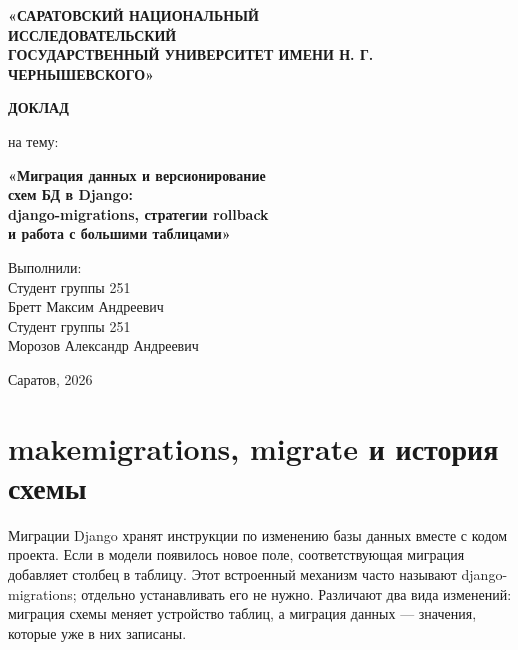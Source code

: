 \documentclass[11pt,a4paper]{article}
\begin{document}
\hypersetup{pageanchor=false}
\begin{titlepage}
\thispagestyle{empty}
\begin{center}
\vspace*{15mm}
{\fontsize{14}{17}\selectfont\bfseries
«САРАТОВСКИЙ НАЦИОНАЛЬНЫЙ\\
ИССЛЕДОВАТЕЛЬСКИЙ\\
ГОСУДАРСТВЕННЫЙ УНИВЕРСИТЕТ ИМЕНИ Н. Г.\\
ЧЕРНЫШЕВСКОГО»\par}
\vspace{40mm}
{\fontsize{20}{24}\selectfont\bfseries ДОКЛАД\par}
\vspace{7mm}
{\large на тему:\par}
\vspace{5mm}
{\fontsize{16}{20}\selectfont\bfseries
«Миграция данных и версионирование\\
схем БД в Django:\\
django-migrations, стратегии rollback\\
и работа с большими таблицами»\par}
\end{center}
\vspace{25mm}
\noindent\hfill\begin{minipage}{0.54\textwidth}
\fontsize{12}{15}\selectfont
Выполнили:\\[3mm]
Студент группы 251\\
Бретт Максим Андреевич\\[5mm]
Студент группы 251\\
Морозов Александр Андреевич
\end{minipage}
\vfill
\begin{center}Саратов, 2026\end{center}
\end{titlepage}
\setcounter{page}{2}
\hypersetup{pageanchor=true}
\section{makemigrations, migrate и история схемы}

Миграции Django хранят инструкции по изменению базы данных вместе с кодом проекта. Если в модели появилось новое поле, соответствующая миграция добавляет столбец в таблицу. Этот встроенный механизм часто называют django-migrations; отдельно устанавливать его не нужно. Различают два вида изменений: миграция схемы меняет устройство таблиц, а миграция данных --- значения, которые уже в них записаны.
\end{document}
